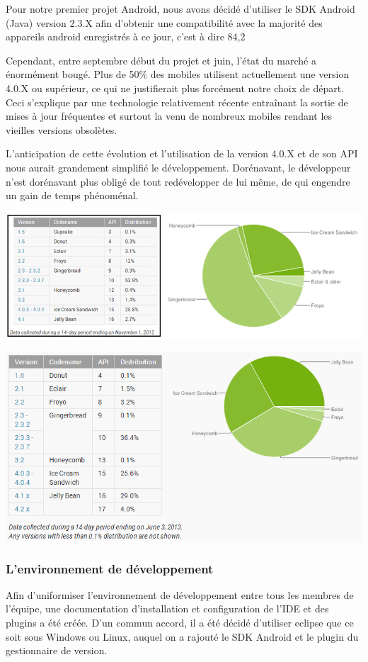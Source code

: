 \documentclass{report}
\begin{document}
Pour notre premier projet Android, nous avons décidé d’utiliser le SDK Android (Java) version 2.3.X afin d’obtenir une compatibilité avec la majorité des appareils android enregistrés à ce jour, c’est à dire 84,2%

Cependant, entre septembre début du projet et juin, l’état du marché a énormément bougé.
Plus de 50\% des mobiles utilisent actuellement une version 4.0.X ou supérieur, ce qui ne justifierait plus forcément notre choix de départ.
Ceci s’explique par une technologie relativement récente entraînant la sortie de mises à jour fréquentes et surtout la venu de nombreux mobiles rendant les vieilles versions obsolètes. 

L’anticipation de cette évolution et l’utilisation de la version 4.0.X et de son API nous aurait grandement simplifié le développement. Dorénavant, le développeur n’est dorénavant plus obligé de tout redévelopper de lui même, de qui engendre un gain de temps phénoménal.
\bigskip

\includegraphics[scale=0.75]{images/graph1}

\includegraphics[scale=0.75]{images/graph2}

\subsubsection{L'environnement de développement}
Afin d’uniformiser l’environnement de développement entre tous les membres de l’équipe, une documentation d’installation et configuration de l’IDE et des plugins a été créée.
D’un commun accord, il a été décidé d’utiliser eclipse que ce soit sous Windows ou Linux, auquel on a rajouté le SDK Android et le plugin du gestionnaire de version.
\end{document}
